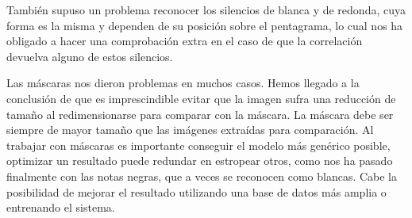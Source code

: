 \documentclass[10pt, a4paper]{article}
\begin{document}
También supuso un problema reconocer los silencios de blanca y de redonda, cuya forma es la misma y dependen de su posición sobre el pentagrama, lo cual nos ha obligado a hacer una comprobación extra en el caso de que la correlación devuelva alguno de estos silencios.

Las máscaras nos dieron problemas en muchos casos. Hemos llegado a la conclusión de que es imprescindible evitar que la imagen sufra una reducción de tamaño al redimensionarse para comparar con la máscara. La máscara debe ser siempre de mayor tamaño que las imágenes extraídas para comparación. Al trabajar con máscaras es importante conseguir el modelo más genérico posible, optimizar un resultado puede redundar en estropear otros, como nos ha pasado finalmente con las notas negras, que a veces se reconocen como blancas. Cabe la posibilidad de mejorar el resultado utilizando una base de datos más amplia o entrenando el sistema.
\end{document}
